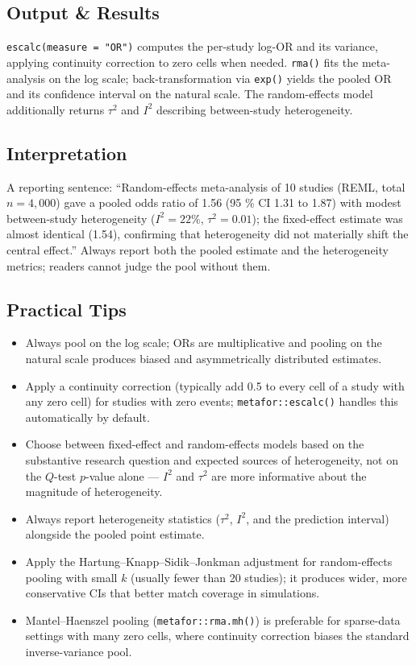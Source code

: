 \documentclass[
]{article}
\providecommand{\tightlist}{%
  \setlength{\itemsep}{0pt}\setlength{\parskip}{0pt}}
\begin{document}
\subsection{Output \& Results}\label{output-results}

\texttt{escalc(measure\ =\ "OR")} computes the per-study log-OR and its
variance, applying continuity correction to zero cells when needed.
\texttt{rma()} fits the meta-analysis on the log scale;
back-transformation via \texttt{exp()} yields the pooled OR and its
confidence interval on the natural scale. The random-effects model
additionally returns \(\tau^2\) and \(I^2\) describing between-study
heterogeneity.

\subsection{Interpretation}\label{interpretation}

A reporting sentence: ``Random-effects meta-analysis of 10 studies
(REML, total \(n = 4{,}000\)) gave a pooled odds ratio of 1.56 (95 \% CI
1.31 to 1.87) with modest between-study heterogeneity (\(I^2 = 22 \%\),
\(\tau^2 = 0.01\)); the fixed-effect estimate was almost identical
(1.54), confirming that heterogeneity did not materially shift the
central effect.'' Always report both the pooled estimate and the
heterogeneity metrics; readers cannot judge the pool without them.

\subsection{Practical Tips}\label{practical-tips}

\begin{itemize}
\tightlist
\item
  Always pool on the log scale; ORs are multiplicative and pooling on
  the natural scale produces biased and asymmetrically distributed
  estimates.
\item
  Apply a continuity correction (typically add 0.5 to every cell of a
  study with any zero cell) for studies with zero events;
  \texttt{metafor::escalc()} handles this automatically by default.
\item
  Choose between fixed-effect and random-effects models based on the
  substantive research question and expected sources of heterogeneity,
  not on the \(Q\)-test \(p\)-value alone --- \(I^2\) and \(\tau^2\) are
  more informative about the magnitude of heterogeneity.
\item
  Always report heterogeneity statistics (\(\tau^2\), \(I^2\), and the
  prediction interval) alongside the pooled point estimate.
\item
  Apply the Hartung--Knapp--Sidik--Jonkman adjustment for random-effects
  pooling with small \(k\) (usually fewer than 20 studies); it produces
  wider, more conservative CIs that better match coverage in
  simulations.
\item
  Mantel--Haenszel pooling (\texttt{metafor::rma.mh()}) is preferable
  for sparse-data settings with many zero cells, where continuity
  correction biases the standard inverse-variance pool.
\end{itemize}
\end{document}
